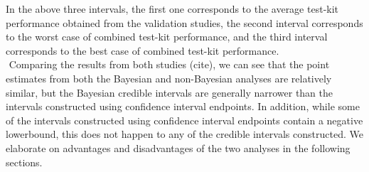 In the above three intervals, the first one corresponds to the average test-kit performance obtained from the validation studies, the second interval corresponds to the worst case of combined test-kit performance, and the third interval corresponds to the best case of combined test-kit performance.\\
\newline$ $
Comparing the results from both studies (cite), we can see that the point estimates from both the Bayesian and non-Bayesian analyses are relatively similar, but the Bayesian credible intervals are generally narrower than the intervals constructed using confidence interval endpoints. In addition, while some of the intervals constructed using confidence interval endpoints contain a negative lowerbound, this does not happen to any of the credible intervals constructed. We elaborate on advantages and disadvantages of the two analyses in the following sections.